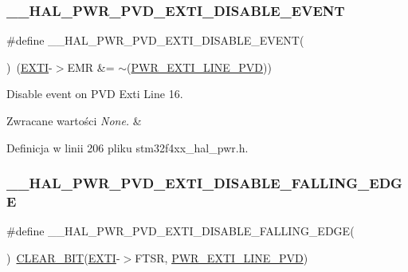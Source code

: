 \subsubsection{\texorpdfstring{\+\_\+\+\_\+\+H\+A\+L\+\_\+\+P\+W\+R\+\_\+\+P\+V\+D\+\_\+\+E\+X\+T\+I\+\_\+\+D\+I\+S\+A\+B\+L\+E\+\_\+\+E\+V\+E\+NT}{\_\_HAL\_PWR\_PVD\_EXTI\_DISABLE\_EVENT}}
{\footnotesize\ttfamily \#define \+\_\+\+\_\+\+H\+A\+L\+\_\+\+P\+W\+R\+\_\+\+P\+V\+D\+\_\+\+E\+X\+T\+I\+\_\+\+D\+I\+S\+A\+B\+L\+E\+\_\+\+E\+V\+E\+NT(\begin{DoxyParamCaption}{ }\end{DoxyParamCaption})~(\hyperlink{group___peripheral__declaration_ga9189e770cd9b63dadd36683eb9843cac}{E\+X\+TI}-\/$>$E\+MR \&= $\sim$(\hyperlink{group___p_w_r___p_v_d___e_x_t_i___line_ga43a49255649e03d2d2b6b12c5c379d2b}{P\+W\+R\+\_\+\+E\+X\+T\+I\+\_\+\+L\+I\+N\+E\+\_\+\+P\+VD}))}



Disable event on P\+VD Exti Line 16. 


\begin{DoxyRetVals}{Zwracane wartości}
{\em None.} & \\
\hline
\end{DoxyRetVals}


Definicja w linii 206 pliku stm32f4xx\+\_\+hal\+\_\+pwr.\+h.

\mbox{\label{group___p_w_r___exported___macro_ga1ca57168205f8cd8d1014e6eb9465f2d}} 
\subsubsection{\texorpdfstring{\+\_\+\+\_\+\+H\+A\+L\+\_\+\+P\+W\+R\+\_\+\+P\+V\+D\+\_\+\+E\+X\+T\+I\+\_\+\+D\+I\+S\+A\+B\+L\+E\+\_\+\+F\+A\+L\+L\+I\+N\+G\+\_\+\+E\+D\+GE}{\_\_HAL\_PWR\_PVD\_EXTI\_DISABLE\_FALLING\_EDGE}}
{\footnotesize\ttfamily \#define \+\_\+\+\_\+\+H\+A\+L\+\_\+\+P\+W\+R\+\_\+\+P\+V\+D\+\_\+\+E\+X\+T\+I\+\_\+\+D\+I\+S\+A\+B\+L\+E\+\_\+\+F\+A\+L\+L\+I\+N\+G\+\_\+\+E\+D\+GE(\begin{DoxyParamCaption}{ }\end{DoxyParamCaption})~\hyperlink{group___exported__macro_ga133aae6fc0d41bffab39ab223a7001de}{C\+L\+E\+A\+R\+\_\+\+B\+IT}(\hyperlink{group___peripheral__declaration_ga9189e770cd9b63dadd36683eb9843cac}{E\+X\+TI}-\/$>$F\+T\+SR, \hyperlink{group___p_w_r___p_v_d___e_x_t_i___line_ga43a49255649e03d2d2b6b12c5c379d2b}{P\+W\+R\+\_\+\+E\+X\+T\+I\+\_\+\+L\+I\+N\+E\+\_\+\+P\+VD})}



